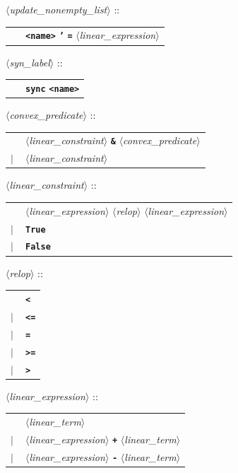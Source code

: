 \documentclass[a4paper,10pt]{article}
\newcommand{\nt}[1]{$\langle$\emph{#1}$\rangle$}
\newcommand{\regleGrammaire}[1]{\bigskip \noindent \nt{#1} :: \\}
\newcommand{\code}[1]{\textbf{\texttt{#1}}}
\begin{document}
\regleGrammaire{update\_nonempty\_list}
\begin{tabular}{l l}
	\  & \code{<name>} \code{'} \code{=} \nt{linear\_expression} \\
\end{tabular}

\regleGrammaire{syn\_label}
\begin{tabular}{l l}
	\  & \code{sync} \code{<name>} \\
\end{tabular}



\regleGrammaire{convex\_predicate}
\begin{tabular}{l l}
	\  & \nt{linear\_constraint} \code{\&} \nt{convex\_predicate} \\
	$|$ & \nt{linear\_constraint} \\
\end{tabular}

\regleGrammaire{linear\_constraint}
\begin{tabular}{l l}
	\  & \nt{linear\_expression} \nt{relop} \nt{linear\_expression} \\
	$|$ & \code{True} \\
	$|$ & \code{False} \\
\end{tabular}

\regleGrammaire{relop}
\begin{tabular}{l l}
	\  & \code{<} \\
	$|$ & \code{<=} \\
	$|$ & \code{=} \\
	$|$ & \code{>=} \\
	$|$ & \code{>} \\
\end{tabular}

\regleGrammaire{linear\_expression}
\begin{tabular}{l l}
	\  & \nt{linear\_term} \\
	$|$ & \nt{linear\_expression} \code{+} \nt{linear\_term} \\
	$|$ & \nt{linear\_expression} \code{-} \nt{linear\_term} \\
\end{tabular}
\end{document}
